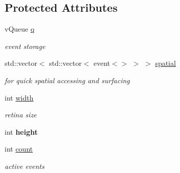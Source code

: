 \subsection*{Protected Attributes}
\begin{DoxyCompactItemize}
\item 
v\+Queue \hyperlink{classev_1_1vSurface2_ad26e2a77d859924e39526fe69ad6e8bf}{q}\hypertarget{classev_1_1vSurface2_ad26e2a77d859924e39526fe69ad6e8bf}{}\label{classev_1_1vSurface2_ad26e2a77d859924e39526fe69ad6e8bf}

\begin{DoxyCompactList}\small\item\em event storage \end{DoxyCompactList}\item 
std\+::vector$<$ std\+::vector$<$ event$<$$>$ $>$ $>$ \hyperlink{classev_1_1vSurface2_aeea3647a3da9c08bd0f3bd577e6ba443}{spatial}\hypertarget{classev_1_1vSurface2_aeea3647a3da9c08bd0f3bd577e6ba443}{}\label{classev_1_1vSurface2_aeea3647a3da9c08bd0f3bd577e6ba443}

\begin{DoxyCompactList}\small\item\em for quick spatial accessing and surfacing \end{DoxyCompactList}\item 
int \hyperlink{classev_1_1vSurface2_a1aa8027816352a15d5b9bf1f26f48e76}{width}\hypertarget{classev_1_1vSurface2_a1aa8027816352a15d5b9bf1f26f48e76}{}\label{classev_1_1vSurface2_a1aa8027816352a15d5b9bf1f26f48e76}

\begin{DoxyCompactList}\small\item\em retina size \end{DoxyCompactList}\item 
int {\bfseries height}\hypertarget{classev_1_1vSurface2_a4cac3483eefdbe9e83ced2ef6bc5f7b2}{}\label{classev_1_1vSurface2_a4cac3483eefdbe9e83ced2ef6bc5f7b2}

\item 
int \hyperlink{classev_1_1vSurface2_a53cfa9932bf60007440cbf535c115222}{count}\hypertarget{classev_1_1vSurface2_a53cfa9932bf60007440cbf535c115222}{}\label{classev_1_1vSurface2_a53cfa9932bf60007440cbf535c115222}

\begin{DoxyCompactList}\small\item\em active events \end{DoxyCompactList}\end{DoxyCompactItemize}


